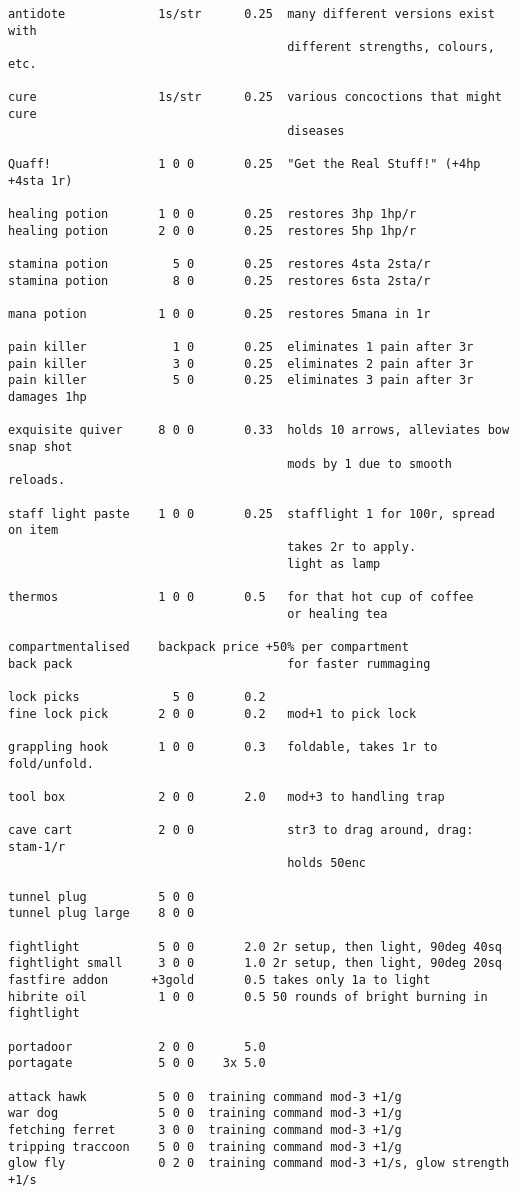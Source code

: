 \small
\begin{verbatim}
antidote             1s/str      0.25  many different versions exist with
                                       different strengths, colours, etc.

cure                 1s/str      0.25  various concoctions that might cure
                                       diseases

Quaff!               1 0 0       0.25  "Get the Real Stuff!" (+4hp +4sta 1r)

healing potion       1 0 0       0.25  restores 3hp 1hp/r
healing potion       2 0 0       0.25  restores 5hp 1hp/r

stamina potion         5 0       0.25  restores 4sta 2sta/r
stamina potion         8 0       0.25  restores 6sta 2sta/r

mana potion          1 0 0       0.25  restores 5mana in 1r

pain killer            1 0       0.25  eliminates 1 pain after 3r
pain killer            3 0       0.25  eliminates 2 pain after 3r
pain killer            5 0       0.25  eliminates 3 pain after 3r damages 1hp

exquisite quiver     8 0 0       0.33  holds 10 arrows, alleviates bow snap shot
                                       mods by 1 due to smooth reloads.

staff light paste    1 0 0       0.25  stafflight 1 for 100r, spread on item
                                       takes 2r to apply.
                                       light as lamp

thermos              1 0 0       0.5   for that hot cup of coffee
                                       or healing tea

compartmentalised    backpack price +50% per compartment
back pack                              for faster rummaging

lock picks             5 0       0.2
fine lock pick       2 0 0       0.2   mod+1 to pick lock

grappling hook       1 0 0       0.3   foldable, takes 1r to fold/unfold.

tool box             2 0 0       2.0   mod+3 to handling trap

cave cart            2 0 0             str3 to drag around, drag: stam-1/r
                                       holds 50enc

tunnel plug          5 0 0
tunnel plug large    8 0 0

fightlight           5 0 0       2.0 2r setup, then light, 90deg 40sq
fightlight small     3 0 0       1.0 2r setup, then light, 90deg 20sq
fastfire addon      +3gold       0.5 takes only 1a to light
hibrite oil          1 0 0       0.5 50 rounds of bright burning in fightlight

portadoor            2 0 0       5.0
portagate            5 0 0    3x 5.0

attack hawk          5 0 0  training command mod-3 +1/g
war dog              5 0 0  training command mod-3 +1/g
fetching ferret      3 0 0  training command mod-3 +1/g
tripping traccoon    5 0 0  training command mod-3 +1/g
glow fly             0 2 0  training command mod-3 +1/s, glow strength +1/s


\end{verbatim}
